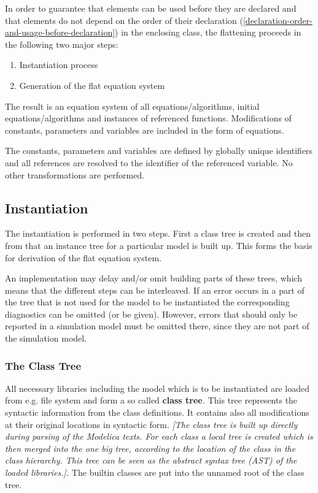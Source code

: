\documentclass[10pt,a4paper]{report}
\def\doublelabel#1{\label{#1}\hypertarget{#1}{}}
\renewcommand{\labelenumi}{\arabic{enumi}.}
\begin{document}
In order to guarantee that elements can be used before they are declared
and that elements do not depend on the order of their declaration
(\ref{declaration-order-and-usage-before-declaration}) in the enclosing class, the flattening proceeds in the
following two major steps:

\begin{enumerate}
\def\labelenumi{\arabic{enumi}.}
\item
  Instantiation process
\item
  Generation of the flat equation system
\end{enumerate}

The result is an equation system of all equations/algorithms, initial
equations/algorithms and instances of referenced functions.
Modifications of constants, parameters and variables are included in the
form of equations.

The constants, parameters and variables are defined by globally unique
identifiers and all references are resolved to the identifier of the
referenced variable. No other transformations are performed.

\subsection{Instantiation}\doublelabel{instantiation}

The instantiation is performed in two steps. First a class tree is
created and then from that an instance tree for a particular model is
built up. This forms the basis for derivation of the flat equation
system.

An implementation may delay and/or omit building parts of these trees,
which means that the different steps can be interleaved. If an error
occurs in a part of the tree that is not used for the model to be
instantiated the corresponding diagnostics can be omitted (or be given).
However, errors that should only be reported in a simulation model must
be omitted there, since they are not part of the simulation model.

\subsubsection{The Class Tree}\doublelabel{the-class-tree}

All necessary libraries including the model which is to be instantiated
are loaded from e.g. file system and form a so called \textbf{class
tree}\emph{.} This tree represents the syntactic information from the
class definitions. It contains also all modifications at their original
locations in syntactic form. \emph{{[}The class tree is built up
directly during parsing of the Modelica texts. For each class a local
tree is created which is then merged into the one big tree, according to
the location of the class in the class hierarchy. This tree can be seen
as the abstract syntax tree (AST) of the loaded libraries.{]}.} The
builtin classes are put into the unnamed root of the class tree.
\end{document}

